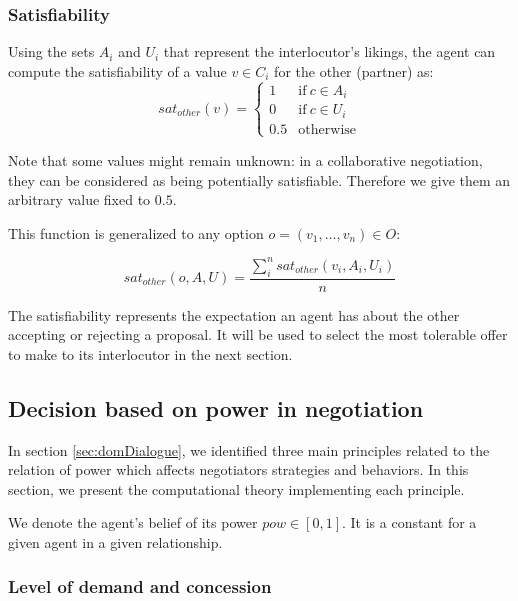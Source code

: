 \documentclass{llncs}
\begin{document}
		\subsubsection*{Satisfiability}
		Using the sets $A_i$ and $U_i$ that represent the interlocutor's likings, the agent can compute the satisfiability of a value $v\in C_i$ for the other (partner) as:
		\vspace{-0.5em} 
		\begin{equation}
		sat_{other}(v)= \left\{\begin{array}{ll}
		1	 & \mathrm{if\ }  c \in A_i\\
		0    & \mathrm{if\ }c \in U_i\\
		0.5	 & \mathrm{otherwise}
		\end{array}\right.
		\end{equation}
		
		Note that some values might remain unknown: in a collaborative negotiation, they can be considered as being potentially satisfiable. Therefore we give them an arbitrary value fixed to $0.5$.
		
		This function is generalized to any option $o=(v_1,\ldots,v_n) \in O$:
		
		\begin{equation}
		sat_{other}(o, A, U) = \frac{ \sum_{i}^{n} sat_{other}(v_i, A_i, U_i) } {n}
		\end{equation}
		
		The satisfiability represents the expectation an agent has about the other accepting or rejecting a proposal. It will be used to select the most tolerable offer to make to its interlocutor in the next section.
		
		\subsection{Decision based on power in negotiation}
		\label{sec:decision}
		
		In section \ref{sec:domDialogue}, we identified three main principles related to the relation of power which affects negotiators strategies and behaviors. In this section, we present the computational theory implementing each principle. 
		
		We denote the agent's belief of its  power $pow \in [0, 1]$. It is a constant for a given agent in a given relationship.
		
		
		\subsubsection{Level of demand and concession}
	
\end{document}
